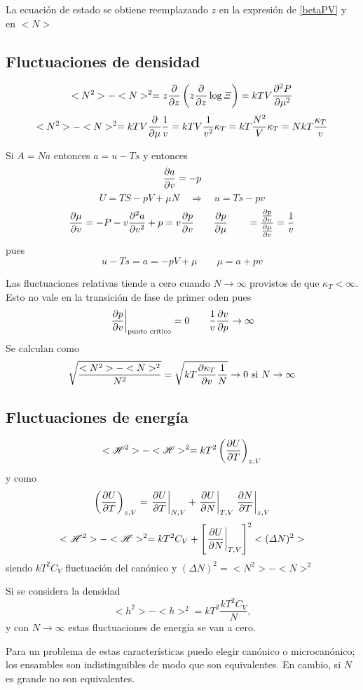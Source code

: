 \documentclass[10pt,oneside]{CBFT_book}
\begin{document}
La ecuación de estado se obtiene reemplazando $z$ en la expresión de \eqref{betaPV} y en $<N>$


\subsection{Fluctuaciones de densidad}

\[
	<N^2> - <N>^2 =  z\dpar{}{z}\left( z\dpar{}{z} \log \Xi \right)= kTV \dpar[2]{P}{\mu}
\]
\[
	<N^2> - <N>^2 = kTV \dpar{}{\mu}\frac{1}{v} = kTV \frac{1}{v^2}\kappa_T = kT\frac{N^2}{V}\kappa_T 
	= NkT \frac{\kappa_T}{v}
\]

Si $A=Na$ entonces $a=u-Ts$ y entonces 
\[
	\dpar{a}{v} = -p
\]
\[
	U = TS-pV+\mu N \quad \Rightarrow \quad u = Ts - pv
\]
\[
	\dpar{\mu}{v} = -P -v\dpar[2]{a}{v} + p = v \dpar{p}{v} \qquad \dpar{p}{\mu} \qquad 
			= \frac{\dpar{p}{v}}{\dpar{\mu}{v}}=\frac{1}{v}
\]
pues 
\[
	u - Ts = a = - pV + \mu \qquad \mu = a + pv
\]

Las fluctuaciones relativas tiende a cero cuando $N\to\infty$ provistos de que $\kappa_T < \infty$. Esto no vale 
en la transición de fase de primer oden pues 
\[
	\left. \dpar{p}{v} \right|_{\text{punto crítico}} = 0 \qquad \frac{1}{v} \dpar{v}{p} \to \infty
\]
Se calculan como 
\[
	\sqrt{\frac{<N^2> - <N>^2}{N^2}} = \sqrt{ kT\dpar{\kappa_T}{v}\frac{1}{N}} \to 0 \text{ si } N\to\infty
\]

\subsection{Fluctuaciones de energía}

\[
	<\Ham^2> - <\Ham>^2 = kT^2 \left( \dpar{U}{T} \right)_{z,V}
\]
y como 
\[
	\left( \dpar{U}{T} \right)_{z,V} = \left.\dpar{U}{T}\right|_{N,V} + \left.\dpar{U}{N}\right|_{T,V} 
	\left.\dpar{N}{T}\right|_{z,V}
\]
\[
	<\Ham^2> - <\Ham>^2 = kT^2C_V +  \left[\left. \dpar{U}{N} \right|_{T,V}\right]^2 <(\Delta N)^2>
\]
siendo $ kT^2C_V $ fluctuación del canónico y $(\Delta N)^2 = <N^2> - <N>^2 $

Si se considera la densidad
\[
	< h^2 > - < h >^2 = kT^2 \frac{k T^2 C_V}{N}, 
\]
y con $ N \to \infty $ estas fluctuaciones de energía se van a cero.

Para un problema de estas características puedo elegir canónico o microcanónico; los ensambles son
indistinguibles de modo que son equivalentes. En cambio, si $N$ es grande no son equivalentes.
\end{document}
